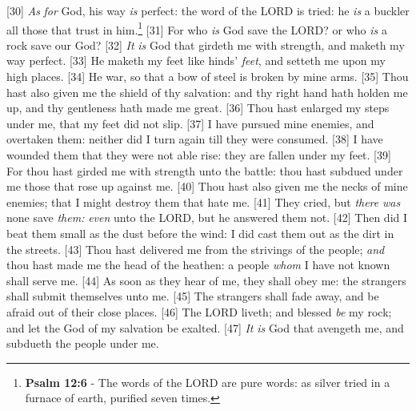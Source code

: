 [30] \textcolor[cmyk]{0.99998,1,0,0}{\emph{As} \emph{for} God, his way \emph{is} perfect: the word of the LORD is tried: he \emph{is} a buckler  all those that trust in him.}\footnote{\textbf{Psalm 12:6} - The words of the LORD are pure words: as silver tried in a furnace of earth, purified seven times.}  
[31] \textcolor[cmyk]{0.99998,1,0,0}{For who \emph{is} God save the LORD? or who \emph{is} a rock save our God?}
[32] \textcolor[cmyk]{0.99998,1,0,0}{\emph{It} \emph{is} God that girdeth me with strength, and maketh my way perfect.}
[33] \textcolor[cmyk]{0.99998,1,0,0}{He maketh my feet like hinds' \emph{feet}, and setteth me upon my high places.}
[34] \textcolor[cmyk]{0.99998,1,0,0}{He   war, so that a bow of steel is broken by mine arms.}
[35] \textcolor[cmyk]{0.99998,1,0,0}{Thou hast also given me the shield of thy salvation: and thy right hand hath holden me up, and thy gentleness hath made me great.}
[36] \textcolor[cmyk]{0.99998,1,0,0}{Thou hast enlarged my steps under me, that my feet did not slip.}
[37] \textcolor[cmyk]{0.99998,1,0,0}{I have pursued mine enemies, and overtaken them: neither did I turn again till they were consumed.}
[38] \textcolor[cmyk]{0.99998,1,0,0}{I have wounded them that they were not able  rise: they are fallen under my feet.}
[39] \textcolor[cmyk]{0.99998,1,0,0}{For thou hast girded me with strength unto the battle: thou hast subdued under me those that rose up against me.}
[40] \textcolor[cmyk]{0.99998,1,0,0}{Thou hast also given me the necks of mine enemies; that I might destroy them that hate me.}
[41] \textcolor[cmyk]{0.99998,1,0,0}{They cried, but \emph{there} \emph{was} none  save \emph{them:} \emph{even} unto the LORD, but he answered them not.}
[42] \textcolor[cmyk]{0.99998,1,0,0}{Then did I beat them small as the dust before the wind: I did cast them out as the dirt in the streets.}
[43] \textcolor[cmyk]{0.99998,1,0,0}{Thou hast delivered me from the strivings of the people; \emph{and} thou hast made me the head of the heathen: a people \emph{whom} I have not known shall serve me.}
[44] \textcolor[cmyk]{0.99998,1,0,0}{As soon as they hear of me, they shall obey me: the strangers shall submit themselves unto me.}
[45] \textcolor[cmyk]{0.99998,1,0,0}{The strangers shall fade away, and be afraid out of their close places.}
[46] \textcolor[cmyk]{0.99998,1,0,0}{The LORD liveth; and blessed \emph{be} my rock; and let the God of my salvation be exalted.}
[47] \textcolor[cmyk]{0.99998,1,0,0}{\emph{It} \emph{is} God that avengeth me, and subdueth the people under me.}
